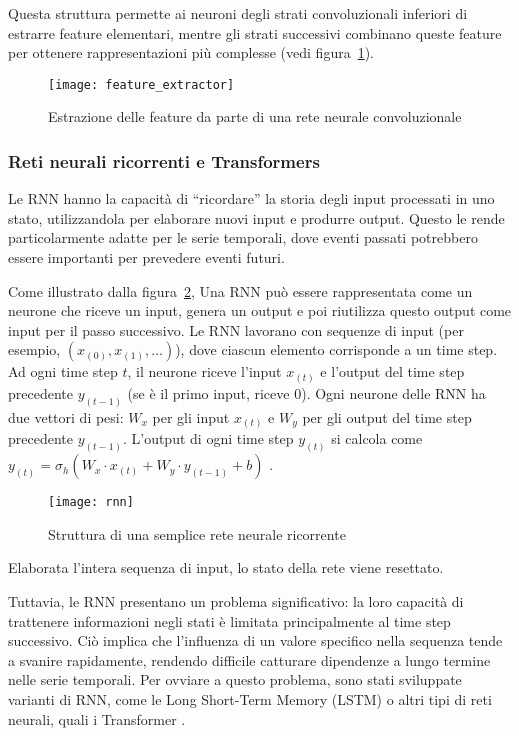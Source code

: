 Questa struttura permette ai neuroni degli strati convoluzionali inferiori di
estrarre feature elementari, mentre gli strati successivi combinano queste
feature per ottenere rappresentazioni più complesse (vedi
figura~\ref{fig:feature_extractor}). 

\begin{figure}[!ht]
    \texttt{[image: feature\_extractor]}
    \caption{Estrazione delle feature da parte di una rete neurale convoluzionale \protect\cite{he2020}}
    \label{fig:feature_extractor}
\end{figure}

\subsubsection{Reti neurali ricorrenti e Transformers}

Le RNN hanno la capacità di ``ricordare'' la storia degli input processati in
uno stato, utilizzandola per elaborare nuovi input e produrre output. Questo
le rende particolarmente adatte per le serie temporali, dove eventi passati
potrebbero essere importanti per prevedere eventi futuri.

Come illustrato dalla figura~\ref{fig:rnn}, Una RNN può essere rappresentata
come un neurone che riceve un input, genera un output e poi riutilizza questo
output come input per il passo successivo. Le RNN lavorano con sequenze di
input (per esempio, $(x_{(0)}, x_{(1)},\ldots)$), dove ciascun elemento
corrisponde a un time step. Ad ogni time step $t$, il neurone riceve l'input
$x_{(t)}$ e l'output del time step precedente $y_{(t-1)}$ (se è il primo
input, riceve 0). Ogni neurone delle RNN ha due vettori di pesi: $W_x$ per gli
input $x_{(t)}$ e $W_y$ per gli output del time step precedente $y_{(t-1)}$.
L'output di ogni time step $y_{(t)}$ si calcola come
$y_{(t)}=\sigma_h(W_x\cdot x_{(t)}+W_y\cdot y_{(t-1)}+b)$ \cite{geron2019}.

\begin{figure}[!ht]
    \centering
    \texttt{[image: rnn]}
    \caption{Struttura di una semplice rete neurale ricorrente \protect\cite{geron2019}}
    \label{fig:rnn}
\end{figure}

Elaborata l'intera sequenza di input, lo stato della rete viene resettato.

Tuttavia, le RNN presentano un problema significativo: la loro capacità di
trattenere informazioni negli stati è limitata principalmente al time step
successivo. Ciò implica che l'influenza di un valore specifico nella sequenza
tende a svanire rapidamente, rendendo difficile catturare dipendenze a lungo
termine nelle serie temporali. Per ovviare a questo problema, sono stati
sviluppate varianti di RNN, come le Long Short-Term Memory (LSTM)
\cite{hochreiter1997} o altri tipi di reti neurali, quali i Transformer
\cite{vaswani2023}.

